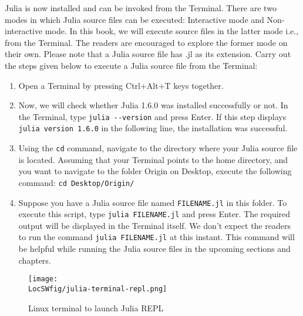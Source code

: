 Julia is now installed and can be invoked from the Terminal. There are two modes in which Julia
source files can be executed: Interactive mode and Non-interactive mode. In this book,
we will execute source files in the latter mode i.e., from the Terminal. The readers are encouraged to explore
the former mode on their own. Please note that a Julia source file has .jl
as its extension. Carry out the steps given below to execute a Julia source file from
the Terminal:
\begin{enumerate}
      \item Open a Terminal by pressing Ctrl+Alt+T keys together.
      \item Now, we will check whether Julia 1.6.0 was installed successfully or not.
            In the Terminal, type {\tt julia -{}-version} and press Enter.
            If this step displays {\tt julia version 1.6.0} in the following line, the installation was successful.
      \item Using the {\tt cd} command, navigate to the directory where your Julia source file is located.
            Assuming that your Terminal points to the
            home directory, and you want to navigate to the folder Origin on
            Desktop, execute the following command: {\tt cd Desktop/Origin/}
      \item Suppose you have a Julia source file named {\tt FILENAME.jl} in this
            folder. To execute this script, type {\tt julia FILENAME.jl} and press
            Enter. The required output will be displayed in the Terminal itself.
            We don't expect the readers to run the command {\tt julia FILENAME.jl} at
            this instant. This command will be helpful while running the Julia
            source files in the upcoming sections and chapters.
\end{enumerate}

\begin{figure}
      \centering
      \texttt{[image: \\LocSWfig/julia-terminal-repl.png]}
      \caption{Linux terminal to launch Julia REPL}
      \label{julia-repl}
\end{figure}


